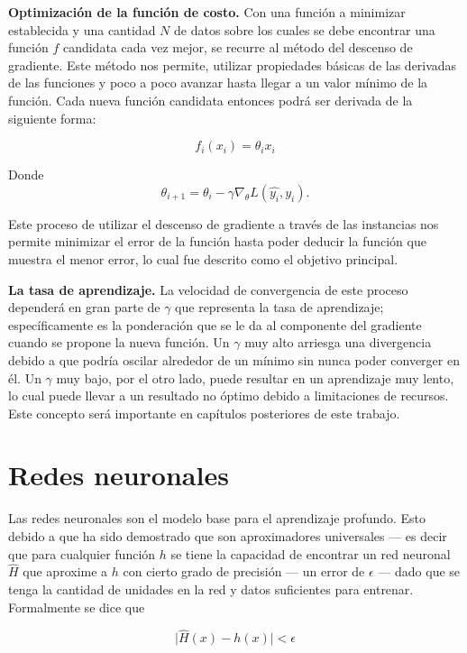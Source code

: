 \textbf{Optimización de la función de costo.} Con una función a minimizar establecida y una cantidad $N$ de datos sobre los cuales se debe encontrar una función $f$ candidata cada vez mejor, se recurre al método del descenso de gradiente. Este método nos permite, utilizar propiedades básicas de las derivadas de las funciones y poco a poco avanzar hasta llegar a un valor mínimo de la función. Cada nueva función candidata entonces podrá ser derivada de la siguiente forma:

\[ f_i(x_i) = \theta_i x_i \]

Donde
\begin{equation}
\label{eq:sgdupdate}
\theta_{i + 1} = \theta_{i} - \gamma \nabla_{\theta} L(\hat{y_i}, y_i).
\end{equation}

Este proceso de utilizar el descenso de gradiente a través de las instancias nos permite  minimizar el error de la función hasta poder deducir la función que muestra el menor error, lo cual fue descrito como el objetivo principal.

\textbf{La tasa de aprendizaje.} La velocidad de convergencia de este proceso dependerá en gran parte de $\gamma$ que representa la tasa de aprendizaje; específicamente es la ponderación que se le da al componente del gradiente cuando se propone la nueva función. Un $\gamma$ muy alto arriesga una divergencia debido a que podría oscilar alrededor de un mínimo sin nunca poder converger en él. Un $\gamma$ muy bajo, por el otro lado, puede resultar en un aprendizaje muy lento, lo cual puede llevar a un resultado no óptimo debido a limitaciones de recursos. Este concepto será importante en capítulos posteriores de este trabajo.

\section{Redes neuronales}

Las redes neuronales son el modelo base para el aprendizaje profundo. Esto debido a que ha sido demostrado que son aproximadores universales \parencite{hornik1989universal} --- es decir que para cualquier función $h$ se tiene la capacidad de encontrar un red neuronal $\hat{H}$ que aproxime a $h$ con cierto grado de precisión --- un error de $\epsilon$ --- dado que se tenga la cantidad de unidades en la red y datos suficientes para entrenar. Formalmente se dice que

\begin{equation}
\label{eq:universaltheorem}
\vert \hat{H}(x) - h(x) \vert < \epsilon
\end{equation}

